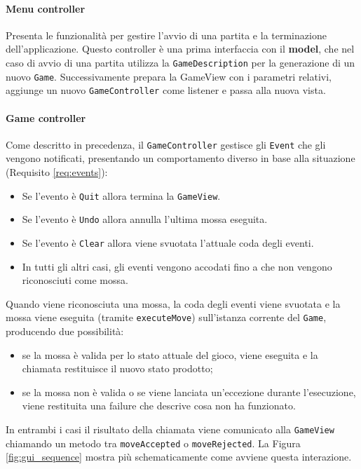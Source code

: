 \paragraph{Menu controller}
Presenta le funzionalità per gestire l'avvio di una partita e la terminazione dell'applicazione.
%
Questo controller è una prima interfaccia con il \textbf{model}, che nel caso di avvio di una partita utilizza la \texttt{GameDescription} per la generazione di un nuovo \texttt{Game}.
%
Successivamente prepara la GameView con i parametri relativi, aggiunge un nuovo \texttt{GameController} come listener e passa alla nuova vista.

\paragraph{Game controller}
%
Come descritto in precedenza, il \texttt{GameController} gestisce gli \texttt{Event} che gli vengono notificati, presentando un comportamento diverso in base alla situazione (Requisito \ref{req:events}):
%
\begin{itemize}
    \item Se l'evento è \texttt{Quit} allora termina la \texttt{GameView}.
    \item Se l'evento è \texttt{Undo} allora annulla l'ultima mossa eseguita.
    \item Se l'evento è \texttt{Clear} allora viene svuotata l'attuale coda degli eventi.
    \item In tutti gli altri casi, gli eventi vengono accodati fino a che non vengono riconosciuti come mossa.
\end{itemize}
%
Quando viene riconosciuta una mossa, la coda degli eventi viene svuotata e la mossa viene eseguita (tramite \texttt{executeMove}) sull'istanza corrente del \texttt{Game}, producendo due possibilità:
\begin{itemize}
    \item se la mossa è valida per lo stato attuale del gioco, viene eseguita e la chiamata restituisce il nuovo stato prodotto;
    \item se la mossa non è valida o se viene lanciata un'eccezione durante l'esecuzione, viene restituita una failure che descrive cosa non ha funzionato.
\end{itemize}
%
In entrambi i casi il risultato della chiamata viene comunicato alla \texttt{GameView} chiamando un metodo tra \texttt{moveAccepted} o \texttt{moveRejected}.
%
La Figura \ref{fig:gui_sequence} mostra più schematicamente come avviene questa interazione.
